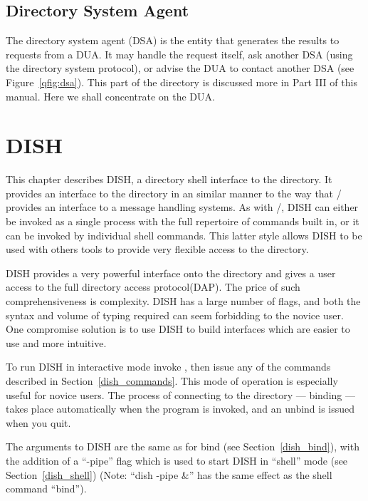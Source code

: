\section{Directory System Agent}


The directory system agent (DSA) is the entity that generates the results to
requests from a DUA.
It may handle the request itself, ask another DSA (using the directory system
protocol), or advise the DUA to
contact another DSA (see Figure~\ref{qfig:dsa}).
This part of the directory is discussed more in Part III of this
manual.  Here we shall concentrate on the DUA.


\chapter{DISH}
\label{dish}

This chapter describes DISH, a directory shell interface to the directory.
It provides an interface to the directory in an similar manner
to the way that \MH/ provides an interface to a message handling systems.
As with \MH/, DISH can either be invoked as a single process with the full
repertoire of commands built in, or it can be invoked by individual shell
commands.
This latter style allows DISH to be used with others tools to provide very
flexible access to the directory.

DISH provides a very powerful interface onto the directory and gives a user
access to the full directory access protocol(DAP).
The price of such comprehensiveness is complexity.
DISH has a large number of flags, and both the syntax and volume of typing
required can seem forbidding to the novice user.
One compromise solution is to use DISH to build interfaces which are easier
to use and more intuitive.

To run DISH in interactive mode invoke , then issue any of the
commands described in Section~\ref{dish_commands}.
This mode of operation is especially useful for novice users.
The process of connecting to the directory --- binding ---
takes place automatically when the program is invoked, and an unbind
is issued when you quit.  

The arguments to DISH are the same as for bind (see 
Section~\ref{dish_bind}), with the addition of a ``-pipe'' flag
which is used to start DISH in ``shell'' mode (see Section~\ref{dish_shell})
(Note: ``dish -pipe \&'' has the same effect as the shell command ``bind'').

